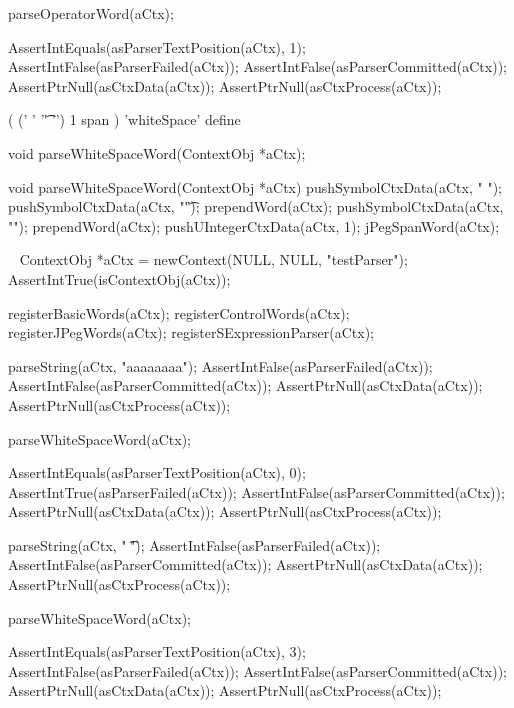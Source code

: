   parseOperatorWord(aCtx);
  
  AssertIntEquals(asParserTextPosition(aCtx), 1);
  AssertIntFalse(asParserFailed(aCtx));
  AssertIntFalse(asParserCommitted(aCtx));
  AssertPtrNull(asCtxData(aCtx));
  AssertPtrNull(asCtxProcess(aCtx));
\stopCTest
\stopTestCase
\stopTestSuite

\startTestSuite[parseWhiteSpaceWord]

\starttyping
(
  (' ' '\t' '\n') 1 span
) 'whiteSpace' define
\stoptyping

\startCHeader
void parseWhiteSpaceWord(ContextObj *aCtx);
\stopCHeader

\startCCode
void parseWhiteSpaceWord(ContextObj *aCtx) {
  pushSymbolCtxData(aCtx, " ");
  pushSymbolCtxData(aCtx, "\t");
  prependWord(aCtx);
  pushSymbolCtxData(aCtx, "\n");
  prependWord(aCtx);
  pushUIntegerCtxData(aCtx, 1);
  jPegSpanWord(aCtx);
}
\stopCCode

\CTestsSuiteSetup\
\startCTest
  ContextObj *aCtx = newContext(NULL, NULL, "testParser");
  AssertIntTrue(isContextObj(aCtx));
  
  registerBasicWords(aCtx);
  registerControlWords(aCtx);
  registerJPegWords(aCtx);
  registerSExpressionParser(aCtx);
\stopCTest

\startCTest
  parseString(aCtx, "aaaaaaaa");
  AssertIntFalse(asParserFailed(aCtx));
  AssertIntFalse(asParserCommitted(aCtx));
  AssertPtrNull(asCtxData(aCtx));
  AssertPtrNull(asCtxProcess(aCtx));
  
  parseWhiteSpaceWord(aCtx);
  
  AssertIntEquals(asParserTextPosition(aCtx), 0);
  AssertIntTrue(asParserFailed(aCtx));
  AssertIntFalse(asParserCommitted(aCtx));
  AssertPtrNull(asCtxData(aCtx));
  AssertPtrNull(asCtxProcess(aCtx));
\stopCTest
\stopTestCase

\startCTest
  parseString(aCtx, " \t\naaa");
  AssertIntFalse(asParserFailed(aCtx));
  AssertIntFalse(asParserCommitted(aCtx));
  AssertPtrNull(asCtxData(aCtx));
  AssertPtrNull(asCtxProcess(aCtx));
  
  parseWhiteSpaceWord(aCtx);
  
  AssertIntEquals(asParserTextPosition(aCtx), 3);
  AssertIntFalse(asParserFailed(aCtx));
  AssertIntFalse(asParserCommitted(aCtx));
  AssertPtrNull(asCtxData(aCtx));
  AssertPtrNull(asCtxProcess(aCtx));
\stopCTest
\stopTestCase
\stopTestSuite

\startTestSuite[parseIdentifierWord]

